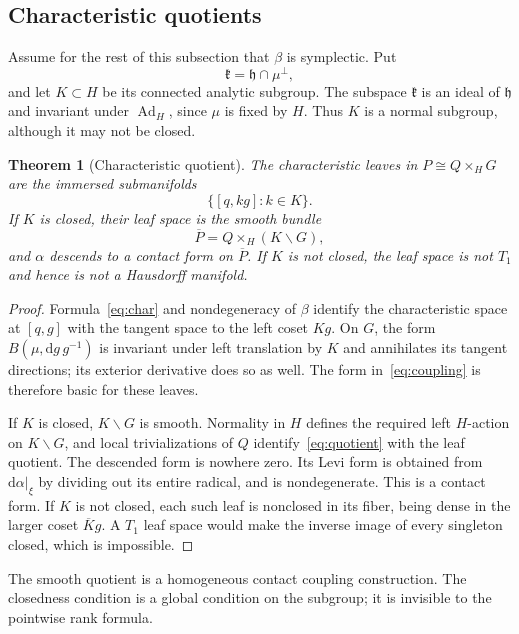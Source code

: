 \documentclass[11pt,a4paper]{article}
\numberwithin{equation}{section}
\newtheorem{theorem}{Theorem}[section]
\theoremstyle{definition}
\theoremstyle{remark}
\newcommand{\h}{\mathfrak h}
\newcommand{\D}{\xi}
\newcommand{\Ad}{\operatorname{Ad}}
\newcommand{\dd}{\mathrm d}
\begin{document}
\subsection{Characteristic quotients}

Assume for the rest of this subsection that $\beta$ is symplectic. Put
\[
 \mathfrak k=\h\cap\mu^\perp,
\]
and let $K\subset H$ be its connected analytic subgroup. The subspace
$\mathfrak k$ is an ideal of $\h$ and invariant under $\Ad_H$, since
$\mu$ is fixed by $H$. Thus $K$ is a normal subgroup, although it may not
be closed.

\begin{theorem}[Characteristic quotient]\label{thm:quotient}
The characteristic leaves in $P\cong Q\times_HG$ are the immersed
submanifolds
\[
 \{[q,kg]:k\in K\}.
\]
If $K$ is closed, their leaf space is the smooth bundle
\begin{equation}\label{eq:quotient}
 \overline P=Q\times_H(K\backslash G),
\end{equation}
and $\alpha$ descends to a contact form on $\overline P$.
If $K$ is not closed, the leaf space is not $T_1$ and hence is not a
Hausdorff manifold.
\end{theorem}

\begin{proof}
Formula~\eqref{eq:char} and nondegeneracy of $\beta$ identify the
characteristic space at $[q,g]$ with the tangent space to the left coset
$Kg$. On $G$, the form $B(\mu,\dd g\,g^{-1})$ is invariant under left
translation by $K$ and annihilates its tangent directions; its exterior
derivative does so as well. The form in~\eqref{eq:coupling} is therefore
basic for these leaves.

If $K$ is closed, $K\backslash G$ is smooth. Normality in $H$ defines
the required left $H$-action on $K\backslash G$, and local trivializations
of $Q$ identify~\eqref{eq:quotient} with the leaf quotient. The descended
form is nowhere zero. Its Levi form is obtained from $\dd\alpha|_\D$
by dividing out its entire radical, and is nondegenerate. This is a contact
form. If $K$ is not closed, each such leaf is nonclosed in its fiber,
being dense in the larger coset $\overline K g$. A $T_1$ leaf space would
make the inverse image of every singleton closed, which is impossible.
\end{proof}

The smooth quotient is a homogeneous contact coupling construction. The
closedness condition is a global condition on the subgroup; it is invisible
to the pointwise rank formula.
\end{document}
